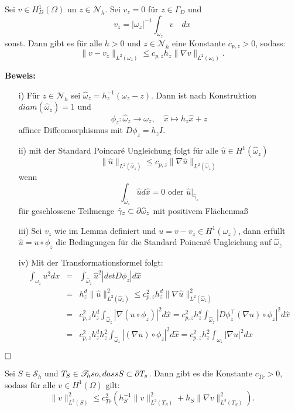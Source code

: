 \begin{lemma}
	Sei $v \in H^1_D(\Omega)$ un $z\in \mathscr{N}_h.$ Sei $v_z= 0$ für $z\in \Gamma_D$ und 
	\[ v_z = |\omega_z|^{-1} \int_{\omega_z} v \quad dx
	\]
	sonst. Dann gibt es für alle $h > 0$ und $z \in \mathscr{N}_h$ eine Konstante $c_{p,z}>0$, sodass:
	\[
	\|v-v_z\|_{L^2(\omega_z)}\leq c_{p,z}h_z\|\nabla v\|_{L^2(\omega_z)}.
	\]
\end{lemma}
\textbf{Beweis:}
\begin{itemize}
	\item[i)] 
	Für $z\in \mathscr{N}_h$ sei $\widehat{\omega}_z = h_z^{-1}(\omega_z - z)$. Dann ist nach Konstruktion $diam(\widehat{\omega}_z) = 1$ und
	\[
	\phi_z : \widehat{\omega}_z \rightarrow \omega_z, \quad \hat{x} \mapsto h_z\hat{x}+z
	\]
	affiner Diffeomorphismus mit $D\phi_z = h_zI$.
	\item[ii)] mit der Standard Poincaré Ungleichung folgt für alle $\widehat{u}\in H^1(\widehat{\omega}_z)$
	\[
	\|\widehat{u}\|_{L^2(\widehat{\omega}_z)} \leq c_{p,z}\|\nabla \widehat{u}\|_{L^2(\widehat{\omega}_z)}
	\]
	wenn \[ \int_{\widehat{\omega}_z}\widehat{u}d\hat{x}=0 \text{ oder }\widehat{u}|_{\hat{\gamma}_z}
	\]
	für geschlossene Teilmenge ${\hat{\gamma}_z} \subset \partial \widehat{\omega}_z$ mit positivem Flächenmaß
	\item[iii)] Sei $v_z$ wie im Lemma definiert und $u= v-v_z\in H^1(\omega_z)$, dann erfüllt $\widehat{u} = u \circ \phi_z$ die Bedingungen für die Standard Poincaré Ungleichung auf $\widehat{\omega}_z$
	\item[iv)] Mit der Transformationsformel folgt:
	\begin{eqnarray*}
		\int_{\omega_z} u^2dx&=& \int_{\widehat{\omega}_z} \widehat{u}^2 | detD\phi_z|d\hat{x} \\
		&=& h_z^d\|\widehat{u}\|^2_{L^2(\widehat{\omega}_z)} \leq c^2_{p,z}h^d_z\|\nabla \widehat{u}\|^2_{L^2(\widehat{\omega}_z)} \\
		&=&c^2_{p,z}h^d_z\int_{\widehat{\omega}_z}| \nabla (u\circ\phi_z)|^2 d\hat{x} = c^2_{p,z}h^d_z \int_{\widehat{\omega}_z}|D\phi_z^\top(\nabla u)\circ\phi_z|^2 d\hat{x} \\
		&=& c^2_{p,z}h^d_zh^2_z\int_{\widehat{\omega}_z}|(\nabla u)\circ\phi_z|^2d\hat{x} 
		=c^2_{p,z}h^2_z\int_{\omega_z}|\nabla u|^2dx
	\end{eqnarray*} 
\end{itemize}
$\hfill \Box$

\begin{lemma}
	Sei $S \in  \mathcal{S}_h$ und $T_S \in \mathscr{T}_h so, dass S \subset \partial T_s$. Dann
	gibt es die Konstante $c_{Tr} > 0$, sodass für alle $v\in H^1(\Omega)$ gilt:
	\[
	\|v\|^2_{L^2(S)} \leq c^2_{Tr}(h_S^{-1}\|v\|^2_{L^2(T_S)}+h_S\|\nabla v\|^2_{L^2(T_S)}).
	\]
\end{lemma}
